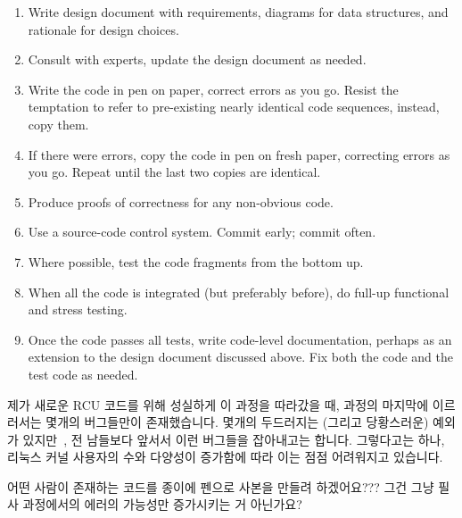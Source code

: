 \begin{enumerate}
\item	Write design document with requirements, diagrams for data structures,
	and rationale for design choices.
\item	Consult with experts, update the design document as needed.
\item	Write the code in pen on paper, correct errors as you go.
	Resist the temptation to refer to pre-existing nearly identical code
	sequences, instead, copy them.
\item	If there were errors, copy the code in pen on fresh paper, correcting
	errors as you go.
	Repeat until the last two copies are identical.
\item	Produce proofs of correctness for any non-obvious code.
\item	Use a source-code control system.
	Commit early; commit often.
\item	Where possible, test the code fragments from the bottom up.
\item	When all the code is integrated (but preferably before),
	do full-up functional and stress testing.
\item	Once the code passes all tests, write code-level documentation,
	perhaps as an extension to the design document discussed above.
	Fix both the code and the test code as needed.
\fi
\end{enumerate}

제가 새로운 RCU 코드를 위해 성실하게 이 과정을 따라갔을 때, 과정의 마지막에
이르러서는 몇개의 버그들만이 존재했습니다.
몇개의 두드러지는 (그리고 당황스러운) 예외가
있지만~\cite{PaulEMcKenney2011RCU3.0trainwreck}, 전 남들보다 앞서서 이런
버그들을 잡아내고는 합니다.
그렇다고는 하나, 리눅스 커널 사용자의 수와 다양성이 증가함에 따라 이는 점점
어려워지고 있습니다.

\QuickQuiz{}
	어떤 사람이 존재하는 코드를 종이에 펜으로 사본을 만들려 하겠어요???
	그건 그냥 필사 과정에서의 에러의 가능성만 증가시키는 거 아닌가요?
	\iffalse

